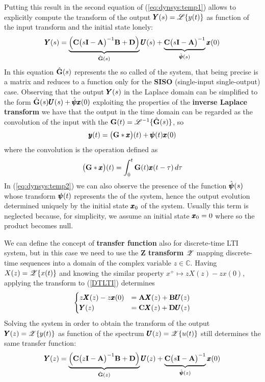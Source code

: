 	Putting this result in the second equation of (\ref{eq:dynsys:temp1}) allows to explicitly compute the transform of the output $\pmb{Y}(s) = \mathscr L\{y(t)\}$ as function of the input transform and the initial state lonely:
	\begin{equation} \label{eq:dynsys:temp2}
		\pmb{Y}(s) = \underbrace{\Big( \mathbf{C} \big(s\mathbf{I} - \mathbf{A} \big)^{-1}\mathbf{B} + \mathbf{D} \Big)}_{\hat {\mathbf{G}}(s)} \pmb{U}(s)  + \underbrace{\mathbf{C} \big(s\mathbf{I} - \mathbf{A} \big)^{-1}}_{\hat{\pmb{\psi}}(s)} \pmb{x}(0)
	\end{equation}
	In this equation $\hat {\mathbf{G}}(s)$ represents the so called  of the system, that being precise is a matrix and reduces to a function only for the \textbf{SISO} (single-input single-output) case. Observing that the output $\pmb{Y}(s)$ in the Laplace domain can be simplified to the form $\hat {\mathbf{G}}(s) \pmb{U}(s) + \hat{\pmb{\psi}} \pmb{x}(0)$ exploiting the properties of the \textbf{inverse Laplace transform} we have that the output in the time domain can be regarded as the convolution of the input with the  $\mathbf{G}(t) = \mathscr L^{-1}\{\hat {\mathbf{G}}(s)\}$, so
	\begin{equation}
		\pmb{y}(t) = \big(\mathbf{G} * \pmb{x}\big)(t) + \pmb{\psi}(t)\pmb{x}(0)
	\end{equation}
	where the convolution is the operation defined as
	\[ \big(\mathbf{G}*\pmb{x}\big)(t) = \int_0^t \mathbf{G}(t)\pmb{x}(t-\tau) \, d\tau \]
	In (\ref{eq:dynsys:temp2}) we can also observe the presence of the function $\hat{\pmb{\psi}}(s)$ whose transform $\pmb{\psi}(t)$ represents the  of the system, hence the output evolution determined uniquely by the initial state $\pmb{x}_0$ of the system. Usually this term is neglected because, for simplicity, we assume an initial state $\pmb{x}_0 = 0$ where so the product becomes null.
	
	We can define the concept of \textbf{transfer function} also for discrete-time LTI system, but in this case we need to use the \textbf{Z transform} $\mathscr Z$ mapping discrete-time sequences into a domain of the complex variable $z \in \mathds C$. Having $X(z) = \mathscr Z\{x(t)\}$ and knowing the similar property $x^+ \mapsto z X(z) - zx(0)$, applying the transform to (\ref{DTLTI}) determines
	\[ \begin{cases}
		z \pmb{X}(z) - z \pmb{x}(0) & = \mathbf{A}\pmb{X}(z) + \mathbf{B} \pmb{U}(z) \\ 
		\pmb{Y}(z) & = \mathbf{C} \pmb{X}(z) + \mathbf{D} \pmb{U}(z)
	\end{cases} \]
	Solving the system in order to obtain the transform of the output $\pmb{Y}(z) = \mathscr Z\{y(t)\}$ as function of the spectrum $\pmb{U}(z) = \mathscr Z\{u(t)\}$ still determines the same transfer function:
	\begin{equation*}
		\pmb{Y}(z) = \underbrace{\Big( \mathbf{C} \big(z\mathbf{I} - \mathbf{A} \big)^{-1}\mathbf{B} + \mathbf{D} \Big)}_{\hat {\mathbf{G}}(z)} \pmb{U}(z)  + \underbrace{\mathbf{C} \big(s\mathbf{I} - \mathbf{A} \big)^{-1}}_{\hat{\pmb{\psi}}(z)} \pmb{x}(0)
	\end{equation*}
	

